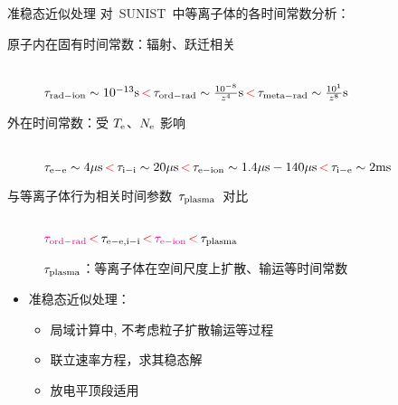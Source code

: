 \begin{frame}{准稳态近似处理}
	对~SUNIST~中等离子体的各时间常数分析：
	\begin{description}
		\item[原子内在固有时间常数：辐射、跃迁相关]
			\quad\\
			\hspace{-3em}
			$\tau_{\rm rad-ion}\sim 10^{-13}{\rm s}\,{\color{red} <}\,
			\tau_{\rm ord-rad}\sim \frac{10^{-8}}{z^4}{\rm s}\,{\color{red} <}\,
			\tau_{\rm meta-rad}\sim \frac{10^{1}}{z^8}{\rm s}$
		\item[外在时间常数：受 $T_{\rm e}$、$N_{\rm e}$ 影响]
			\quad\\
			\hspace{-3em}
			$\tau_{\rm e-e}\sim 4 {\rm \mu s}\,{\color{red} <}\,
            \tau_{\rm i-i}\sim 20 {\rm \mu s}\,{\color{red} <}\,
            \tau_{\rm e-ion}\sim 1.4 {\rm \mu s} - 140 {\rm \mu s}\,{\color{red} <}\,
            \tau_{\rm i-e}\sim 2 {\rm ms}$
		\item[与等离子体行为相关时间参数~$\tau_{\rm{plasma}}$~对比]
			\quad\\
			\hspace{-3em}
			${\color{magenta}\tau_{\rm ord-rad}} \,{\color{red} <}\,
            \tau_{\rm e-e,i-i} \,{\color{red} <}\,
            {\color{magenta}\tau_{\rm e-ion}} \,{\color{red} <}\,
            \tau_{\rm plasma}$%

			$\tau_{\rm{plasma}}$：等离子体在空间尺度上扩散、输运等时间常数
	\end{description}
	
	\begin{itemize}%
		\item 准稳态近似处理：%
			\begin{itemize}
				\item 局域计算中, 不考虑粒子扩散输运等过程
				\item 联立速率方程，求其稳态解
				\item 放电平顶段适用
			\end{itemize}
	\end{itemize}

\end{frame}


